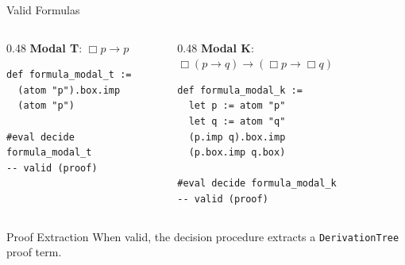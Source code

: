\documentclass[aspectratio=169,11pt]{beamer}
\newcommand{\nec}{\Box}
\newcommand{\imp}{\rightarrow}
\begin{document}
\begin{frame}[fragile]{Valid Formulas}

\begin{columns}
\begin{column}{0.48\textwidth}
\textbf{Modal T}: $\nec p \imp p$
\begin{lstlisting}[basicstyle=\ttfamily\scriptsize]
def formula_modal_t :=
  (atom "p").box.imp
  (atom "p")

#eval decide formula_modal_t
-- valid (proof)
\end{lstlisting}
\end{column}
\begin{column}{0.48\textwidth}
\textbf{Modal K}: $\nec(p \imp q) \imp (\nec p \imp \nec q)$
\begin{lstlisting}[basicstyle=\ttfamily\scriptsize]
def formula_modal_k :=
  let p := atom "p"
  let q := atom "q"
  (p.imp q).box.imp
  (p.box.imp q.box)

#eval decide formula_modal_k
-- valid (proof)
\end{lstlisting}
\end{column}
\end{columns}

\vspace{0.5cm}

\begin{alertblock}{Proof Extraction}
When valid, the decision procedure extracts a \texttt{DerivationTree} proof term.
\end{alertblock}

\end{frame}
\end{document}
